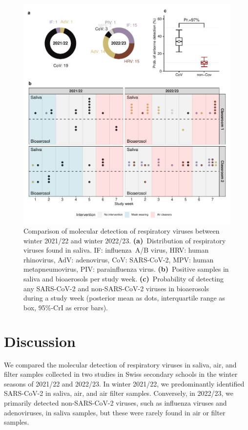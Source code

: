 \documentclass[fleqn,11pt]{wlscirep}
\begin{document}
\begin{figure}
    \centering
    \includegraphics{results/comparison.pdf}
    \caption{Comparison of molecular detection of respiratory viruses between winter 2021/22 and winter 2022/23. \textbf{(a)}~Distribution of respiratory viruses found in saliva. IF: influenza~A/B virus, HRV: human rhinovirus, AdV: adenovirus, CoV: SARS-CoV-2, MPV: human metapneumovirus, PIV: parainfluenza virus. \textbf{(b)}~Positive samples in saliva and bioaerosols per study week. \textbf{(c)}~Probability of detecting any SARS-CoV-2 and non-SARS-CoV-2 viruses in bioaerosols during a study week (posterior mean as dots, interquartile range as box, 95\%-CrI as error bars).}
    \label{fig:comparison}
\end{figure}


\section*{Discussion}


We compared the molecular detection of respiratory viruses in saliva, air, and filter samples collected in two studies in Swiss secondary schools in the winter seasons of 2021/22 and 2022/23. In winter 2021/22, we predominantly identified SARS-CoV-2 in saliva, air, and air filter samples. Conversely, in 2022/23, we primarily detected non-SARS-CoV-2 viruses, such as influenza viruses and adenoviruses, in saliva samples, but these were rarely found in air or filter samples. 
\end{document}
